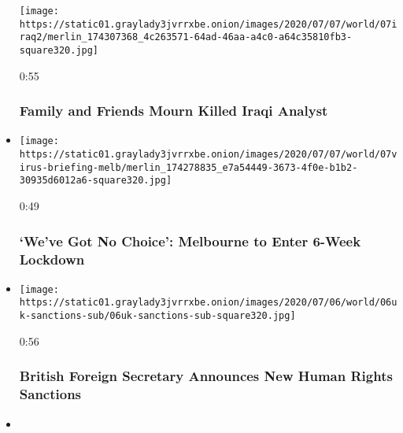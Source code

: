 \begin{itemize}
  \texttt{[image: https://static01.graylady3jvrrxbe.onion/images/2020/07/07/world/07iraq2/merlin\_174307368\_4c263571-64ad-46aa-a4c0-a64c35810fb3-square320.jpg]}

  0:55

  \hypertarget{family-and-friends-mourn-killed-iraqi-analyst}{%
  \subsubsection{Family and Friends Mourn Killed Iraqi
  Analyst}\label{family-and-friends-mourn-killed-iraqi-analyst}}
\item
  \href{https://www.nytimes3xbfgragh.onion/video/world/australia/100000007227099/melbourne-australia-lockdown.html?action=click\&module=video-series-bar\&region=header\&pgtype=Article\&playlistId=video/world}{}

  \texttt{[image: https://static01.graylady3jvrrxbe.onion/images/2020/07/07/world/07virus-briefing-melb/merlin\_174278835\_e7a54449-3673-4f0e-b1b2-30935d6012a6-square320.jpg]}

  0:49

  \hypertarget{weve-got-no-choice-melbourne-to-enter-6-week-lockdown}{%
  \subsubsection{`We've Got No Choice': Melbourne to Enter 6-Week
  Lockdown}\label{weve-got-no-choice-melbourne-to-enter-6-week-lockdown}}
\item
  \href{https://www.nytimes3xbfgragh.onion/video/us/100000007226270/britain-raab-human-rights-sanctions.html?action=click\&module=video-series-bar\&region=header\&pgtype=Article\&playlistId=video/world}{}

  \texttt{[image: https://static01.graylady3jvrrxbe.onion/images/2020/07/06/world/06uk-sanctions-sub/06uk-sanctions-sub-square320.jpg]}

  0:56

  \hypertarget{british-foreign-secretary-announces-new-human-rights-sanctions}{%
  \subsubsection{British Foreign Secretary Announces New Human Rights
  Sanctions}\label{british-foreign-secretary-announces-new-human-rights-sanctions}}
\item
  \href{https://www.nytimes3xbfgragh.onion/video/world/middleeast/100000007214556/pakistan-stock-exchange.html?action=click\&module=video-series-bar\&region=header\&pgtype=Article\&playlistId=video/world}{}


\end{itemize}
